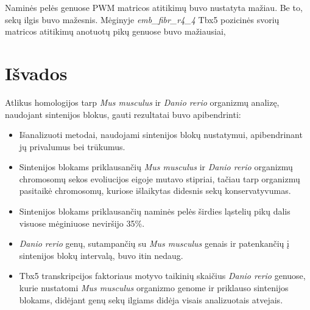 \documentclass[12pt]{article}
\begin{document}
Naminės pelės genuose PWM matricos atitikimų buvo nustatyta mažiau. Be to, sekų
ilgis buvo mažesnis. Mėginyje \emph{emb\_fibr\_r4\_4} Tbx5 pozicinės svorių
matricos atitikimų anotuotų pikų genuose buvo mažiausiai,


\newpage


\section{Išvados}
Atlikus homologijos tarp \emph{Mus musculus} ir \emph{Danio rerio} organizmų
analizę, naudojant sintenijos blokus, gauti rezultatai buvo apibendrinti:

\begin{itemize}
    \item Išanalizuoti metodai, naudojami sintenijos blokų nustatymui,
        apibendrinant jų privalumus bei trūkumus.
    \item Sintenijos blokams priklausančių \emph{Mus musculus} ir
        \emph{Danio rerio} organizmų chromosomų sekos evoliucijos eigoje mutavo
        stipriai, tačiau tarp organizmų pasitaikė chromosomų, kuriose
        išlaikytas didesnis sekų konservatyvumas.
    \item Sintenijos blokams priklausančių naminės pelės širdies ląstelių pikų
        dalis visuose mėginiuose neviršijo 35\%.
    \item \emph{Danio rerio} genų, sutampančių su \emph{Mus musculus} genais ir
        patenkančių į sintenijos blokų intervalą, buvo itin nedaug.
    \item Tbx5 transkripcijos faktoriaus motyvo taikinių skaičius
        \emph{Danio rerio} genuose, kurie nustatomi \emph{Mus musculus}
        organizmo genome ir priklauso sintenijos blokams, didėjant
        genų sekų ilgiams didėja visais analizuotais atvejais.
\end{itemize}


\newpage
\end{document}
